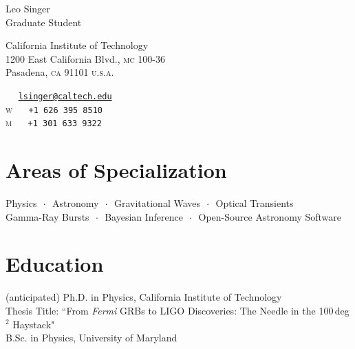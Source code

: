 \documentclass[10pt, letterpaper]{article} %
\newcommand{\listsep}{$\,\cdot\,$}
\newcommand{\years}[1]{\marginnote{\scriptsize #1}} %
\begin{document}

{\LARGE Leo Singer}\\[1cm] %
Graduate Student\\
\begin{minipage}[t][2cm][s]{8cm}
California Institute of Technology\\ %
1200 East California Blvd., \textsc{mc} 100-36\\
Pasadena, \textsc{ca} 91101 \textsc{u.s.a.}\\[.2cm]
\end{minipage}\begin{minipage}[t][2cm][s]{5cm}
{\tiny\faEnvelopeAlt} \,\,\,\,\,\, \href{mailto:lsinger@caltech.edu}{\small \texttt{lsinger@caltech.edu}}\\
\textsc{w} \,\,\,\,\,\, \texttt{\small +1 626 395 8510}\\ %
\textsc{m} \,\,\,\,\,\, \texttt{\small +1 301 633 9322}\\ %
\end{minipage}

\section*{Areas of Specialization}

Physics \listsep{}  Astronomy \listsep{} Gravitational Waves \listsep{} Optical Transients \\
Gamma-Ray Bursts \listsep{}  Bayesian Inference \listsep{} Open-Source Astronomy Software

\section*{Education}

\years{2014}(anticipated) Ph.D. in Physics, California Institute of Technology\\
Thesis Title: “From \emph{Fermi} GRBs to LIGO Discoveries: The Needle in the 100\,deg$^2$ Haystack"\\[0.125cm]
%
\years{2009}B.Sc. in Physics, University of Maryland
\end{document}
